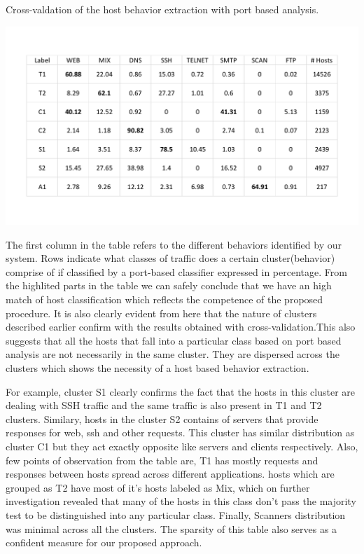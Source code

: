 \begin{table}[t]
	\caption{Cross-valdation of the host behavior extraction with port based analysis.}%
	\centerline{\includegraphics[scale = 0.5]{validation.pdf}}	
\end{table}

The first column in the table refers to the different behaviors identified by our system. Rows indicate what classes of traffic does a certain cluster(behavior) comprise of if classified by a  port-based classifier expressed in percentage.
From the highlited parts in the table we can safely conclude that 
we have an high match of host classification which reflects the competence of the proposed procedure. It is also clearly evident from here that the nature of clusters described earlier confirm with the results obtained with cross-validation.This also suggests that all the hosts that fall into a particular class based on port based analysis are not necessarily in the same cluster. They are dispersed across the clusters which shows the necessity of a host based behavior extraction.

For example, cluster S1 clearly confirms the fact that the hosts in this cluster are dealing with SSH traffic and the same traffic is also present in T1 and T2 clusters. Similary, hosts in the cluster S2 contains of servers that provide responses for web, ssh and other requests. This cluster has similar distribution as cluster C1 but they act exactly opposite like servers and clients respectively. Also, few points of observation from the table are, T1 has mostly requests and responses between hosts spread across different applications. hosts which are grouped as T2 have most of it's hosts labeled as Mix, which on further investigation revealed that many of the hosts in this class don't pass the majority test to be distinguished into any particular class. Finally, Scanners distribution was minimal across all the clusters. The sparsity of this table also serves as a confident measure for our proposed approach.

